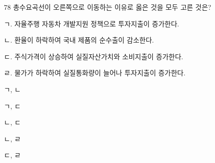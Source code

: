 \begin{question}{78}
총수요곡선이 오른쪽으로 이동하는 이유로 옳은 것을 모두 고른 것은?
\begin{framedtext}
ㄱ. 자율주행 자동차 개발지원 정책으로 투자지출이 증가한다. \par
ㄴ. 환율이 하락하여 국내 제품의 순수출이 감소한다. \par
ㄷ. 주식가격이 상승하여 실질자산가치와 소비지출이 증가한다. \par
ㄹ. 물가가 하락하여 실질통화량이 늘어나 투자지출이 증가한다. \par
\end{framedtext}
\begin{choices}
  \item ㄱ, ㄴ
  \item ㄱ, ㄷ
  \item ㄴ, ㄷ
  \item ㄴ, ㄹ
  \item ㄷ, ㄹ
\end{choices}
\end{question}
